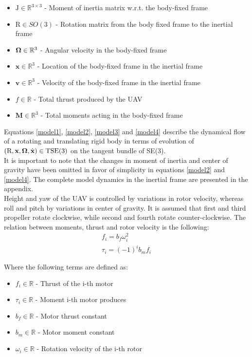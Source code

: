 \begin{itemize}
	\item $\text{J} \in \mathbb{R}^{3 \times 3}$ - Moment of inertia matrix w.r.t. the body-fixed frame
	
	\item $\text{R} \in SO(3)$ - Rotation matrix from the body fixed frame to the inertial frame
	
	\item $\boldsymbol{\Omega} \in \mathbb{R}^3$ - Angular velocity in the body-fixed frame
	
	\item $\textbf{x} \in \mathbb{R}^3$ - Location of the body-fixed frame in the inertial frame
	
	\item $\textbf{v} \in \mathbb{R}^3$ - Velocity of the body-fixed frame in the inertial frame
	
	\item $f \in \mathbb{R}$ - Total thrust produced by the UAV
	
	\item $\textbf{M} \in \mathbb{R}^3$ - Total moments acting in the body-fixed frame
\end{itemize}
\indent Equations \ref{model1}, \ref{model2}, \ref{model3} and \ref{model4} describe the dynamical flow of a rotating and translating rigid body in terms of evolution of $(\text{R},\textbf{x},\boldsymbol{\Omega},\dot{\textbf{x}})\in \text{TSE}(3)$ on the tangent bundle of SE(3). \\
It is important to note that the changes in moment of inertia and center of gravity have been omitted in favor of simplicity in equations \ref{model2} and \ref{model4}. The complete model dynamics in the inertial frame are presented in the appendix.\\
\indent Height and yaw of the UAV is controlled by variations in rotor velocity, whereas roll and pitch by variations in center of gravity. It is assumed that first and third propeller rotate clockwise, while second and fourth rotate counter-clockwise. The relation between moments, thrust and rotor velocity is the following:
\begin{gather}
	f_i = b_f \omega_{i}^2 \label{force}\\
	\tau_i = (-1)^i b_m f_i
\end{gather}

\noindent Where the following terms are defined as:

\begin{itemize}
	\item $f_i \in \mathbb{R}$ - Thrust of the i-th motor
	
	\item $\tau_i \in \mathbb{R}$ - Moment i-th motor produces
	
	\item $b_f \in \mathbb{R}$ - Motor thrust constant
	
	\item $b_m \in \mathbb{R}$ - Motor moment constant
	
	\item $\omega_i \in \mathbb{R}$ - Rotation velocity of the i-th rotor
\end{itemize}

